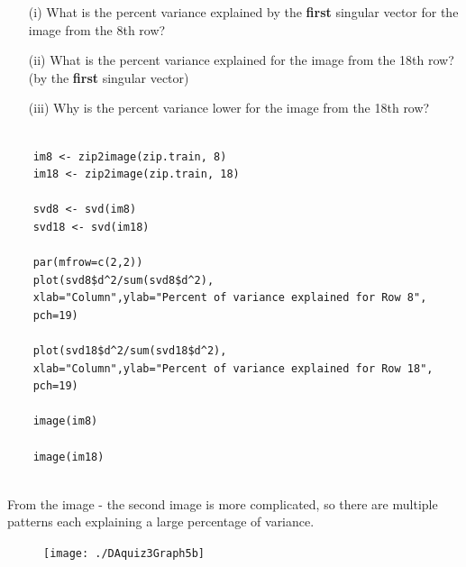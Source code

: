 \documentclass[]{article}
\begin{document}
\begin{itemize}
	\item[(i)] What is the percent variance explained by the \textbf{first} singular vector for the image
	from the 8th row? 
	\item[(ii)] What is the percent variance explained for the image from the
	18th row? (by the \textbf{first} singular vector)
	\item[(iii)] Why is the percent variance lower for the image from the 18th row?
\end{itemize}
\newpage
\begin{framed}
	\begin{verbatim}
	
	im8 <- zip2image(zip.train, 8)
	im18 <- zip2image(zip.train, 18)
	
	svd8 <- svd(im8)
	svd18 <- svd(im18)
	
	par(mfrow=c(2,2))
	plot(svd8$d^2/sum(svd8$d^2),
	xlab="Column",ylab="Percent of variance explained for Row 8",
	pch=19)
	
	plot(svd18$d^2/sum(svd18$d^2),
	xlab="Column",ylab="Percent of variance explained for Row 18",
	pch=19)
	
	image(im8)
	
	image(im18)
	
	\end{verbatim}
\end{framed}
\newpage
From the image - the second image is more complicated, so there are multiple patterns each explaining a large percentage of variance.
\begin{figure}[h!]
	\centering
	\texttt{[image: ./DAquiz3Graph5b]}
	\caption{}
	\label{fig:DAquiz3Graph5}
\end{figure}
\end{document}
